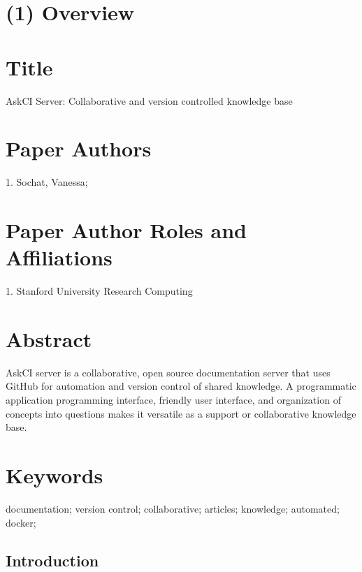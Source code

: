 \documentclass{jors}
\begin{document}
\section*{(1) Overview}
\thispagestyle{empty} 

\vspace{0.5cm}

\section*{Title}

AskCI Server: Collaborative and version controlled knowledge base

\section*{Paper Authors}
1. Sochat, Vanessa;

\section*{Paper Author Roles and Affiliations}
1. Stanford University Research Computing

\section*{Abstract}

AskCI server is a collaborative, open source documentation server that uses GitHub for automation and version control of shared knowledge. A programmatic application programming interface, friendly user interface, and organization of concepts into questions makes it versatile as a support or collaborative knowledge base.

\section*{Keywords}

documentation; version control; collaborative; articles; knowledge; automated; docker;

\subsection*{Introduction}
\end{document}
